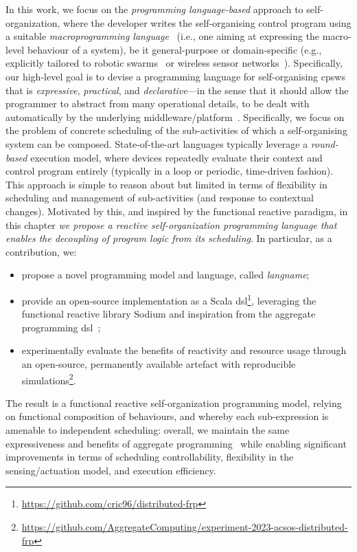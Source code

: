 In this work, we focus on the \emph{programming language-based} approach to self-organization,
 where the developer writes the self-organising control program
 using a suitable \emph{macroprogramming language}~\cite{casadei2023macro,DBLP:journals/jisa/JuniorSBP21} (i.e., one aiming at expressing the macro-level behaviour of a system), be it general-purpose or domain-specific (e.g., explicitly tailored to robotic swarms~\cite{DBLP:journals/swarm/BrambillaFBD13} or wireless sensor networks~\cite{DBLP:journals/csur/MottolaP11}).
%
Specifically, our high-level goal
 is to devise a programming language
 for self-organising \acp{cpsw}
 that is \emph{expressive}, \emph{practical},
 and \emph{declarative}---in the sense that it should allow the programmer to abstract from
many operational details, to be dealt with automatically by the underlying middleware/platform~\cite{DBLP:conf/iotdi/NoorTGS19,CPPVW-FI2020}.
%
Specifically, we focus on the problem of concrete scheduling of the sub-activities of which a self-organising system can be composed.
%
State-of-the-art languages typically leverage a \emph{round-based} execution model,
 where devices repeatedly evaluate their context and control program entirely
(typically in a loop or periodic, time-driven fashion).
%
This approach is simple to reason about but
 limited in terms of flexibility in scheduling
 and management of sub-activities (and response to contextual changes).
%
Motivated by this, and inspired by the functional reactive paradigm,
 in this chapter 
 \emph{we propose a reactive self-organization programming language
 that enables the decoupling of program logic from its scheduling}.
% 
In particular, as a contribution, we:
\begin{itemize}
\item propose a novel programming model and language, called \emph{\ac{langname}};
\item provide an open-source implementation as a Scala \ac{dsl}\footnote{\label{acsos2023-frp:footnote:dsl}\url{https://github.com/cric96/distributed-frp}},
 leveraging the functional reactive library Sodium and 
 inspiration from the \scafi{} aggregate programming \ac{dsl}~\cite{DBLP:journals/softx/CasadeiVAP22,DBLP:journals/lmcs/AudritoCDV23};
\item experimentally evaluate the benefits of reactivity and resource usage
through an open-source, permanently available artefact with reproducible simulations\footnote{\label{acsos2023-frp:footnote:eval}\url{https://github.com/AggregateComputing/experiment-2023-acsos-distributed-frp}}.
\end{itemize}
%
The result is a functional reactive self-organization programming model, 
 relying on functional composition of behaviours,
and whereby each sub-expression is amenable to independent scheduling:
 overall, we maintain the same expressiveness and benefits of aggregate programming~\cite{bpv:aggregate:programming,vbdacp:ac:survey:jlamp}
 while enabling significant improvements in terms of scheduling controllability, flexibility in the sensing/actuation model, and execution efficiency. %
 
